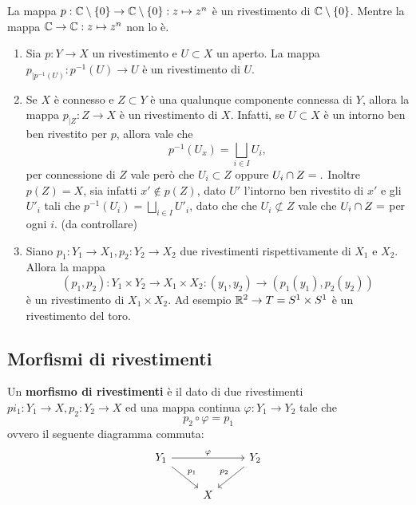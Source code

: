 \documentclass[]{article}
\begin{document}
\begin{example}  \nl
    La mappa $p: \mathbb{C} \setminus \left\{ 0 \right\} \to \mathbb{C} \setminus \left\{ 0 \right\}: z \mapsto z^n$ \`e un rivestimento di $\mathbb{C} \setminus \left\{ 0 \right\}$.
    Mentre la mappa $\mathbb{C} \to \mathbb{C}: z \mapsto z^n$ non lo \`e.
\end{example}

\begin{proposition}  \nl
    \begin{enumerate}
        \item Sia $p: Y \to X$ un rivestimento e $U \subset X$ un aperto. \nl
        La mappa $p_{\big| p^{-1}(U)}: p^{-1}(U) \to U$ \`e un rivestimento di $U$.
        \item Se $X$ \`e connesso e $Z \subset Y$ \`e una qualunque componente connessa di $Y$, allora 
        la mappa $p_{\big| Z}: Z \to X$ \`e un rivestimento di $X$. \nl
        Infatti, se $U \subset X$ \`e un intorno ben ben rivestito per $p$, allora vale che
        \[
            p^{-1}(U_x) = \bigsqcup_{i \in I} U_i,
        \]
        per connessione di $Z$ vale per\`o che $U_i \subset Z$ oppure $U_i \cap Z = \empty.$ \nl
        Inoltre $p(Z) = X$, sia infatti $x' \not\in p(Z)$, dato $U'$ l'intorno ben rivestito di $x'$ e
        gli $U'_i$ tali che $p^{-1}(U_i) = \bigsqcup_{i \in I} U'_i$, dato che che $U_i \not\subset Z$ vale che
        $U_i \cap Z = \empty $ per ogni $i$. (da controllare)
        \item Siano $p_1: Y_1 \to X_1, p_2: Y_2 \to X_2$ due rivestimenti rispettivamente di $X_1$ e $X_2$. Allora la mappa
        \[  
            \left(p_1, p_2\right): Y_1 \times Y_2 \to X_1 \times X_2: (y_1, y_2) \to (p_1(y_1), p_2(y_2))
        \]
        \`e un rivestimento di $X_1 \times X_2$. \nl
        Ad esempio $\mathbb{R}^2 \to T = S^{1} \times S^{1}$ \`e un rivestimento del toro.

    \end{enumerate}
\end{proposition}

\subsection{Morfismi di rivestimenti}

\begin{definition}  \nl
    Un \textbf{morfismo di rivestimenti} \`e il dato di due rivestimenti $pi_1: Y_1 \to X, p_2: Y_2 \to X$
    ed una mappa continua $\varphi: Y_1 \to Y_2$ tale che
    \[
        p_2 \circ \varphi = p_1
    \]
    ovvero il seguente diagramma commuta:
    \[\begin{tikzcd}
	{Y_1} && {Y_2} \\
	& X
	\arrow["\varphi", from=1-1, to=1-3]
	\arrow["{p_1}", from=1-1, to=2-2]
	\arrow["{p_2}"', from=1-3, to=2-2]
    \end{tikzcd}\]
\end{definition}
\end{document}
